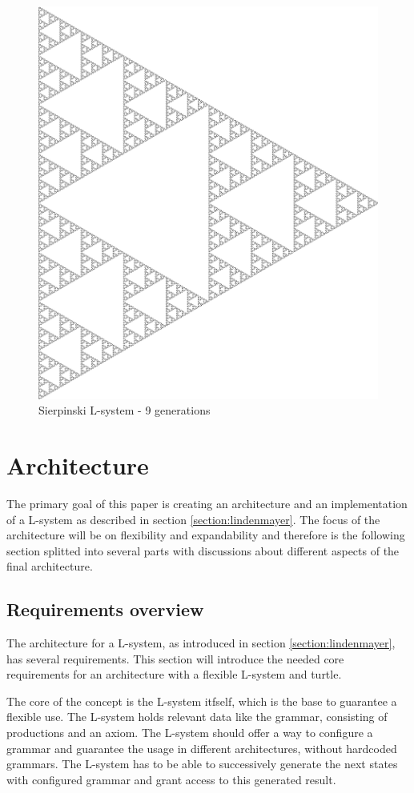 \documentclass[english]{cpp-hmwk}
\begin{document}
\begin{figure}[h!]
	\centering
	\includegraphics[width=0.6\columnwidth]{../graphs/Examples/sierpinski.png}
	\caption{Sierpinski L-system - 9 generations}
	\label{figure:Sierpinski}
\end{figure}
 

\clearpage
\section{Architecture}
The primary goal of this paper is creating an architecture and an implementation of a L-system as described in section \ref{section:lindenmayer}. The focus of the architecture will be on flexibility and expandability and therefore is the following section splitted into several parts with discussions about different aspects of the final architecture.

\subsection{Requirements overview}
The architecture for a L-system, as introduced in section \ref{section:lindenmayer}, has several requirements. This section will introduce the needed core requirements for an architecture with a flexible L-system and turtle.

\medskip
\noindent The core of the concept is the L-system itfself, which is the base to guarantee a flexible use. The L-system holds relevant data like the grammar, consisting of productions and an axiom. The L-system should offer a way to configure a grammar and guarantee the usage in different architectures, without hardcoded grammars. The L-system has to be able to successively generate the next states with configured grammar and grant access to this generated result.
\end{document}
